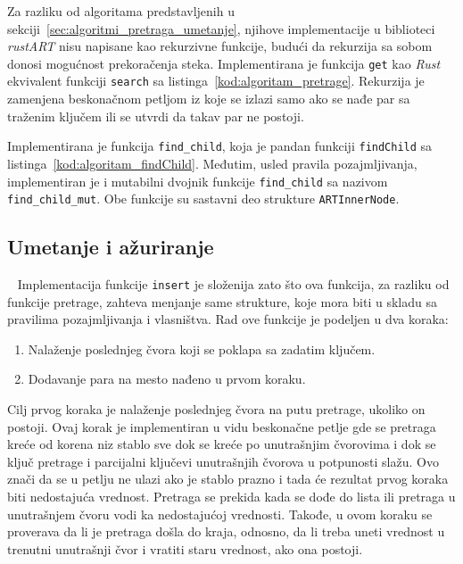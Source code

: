 \documentclass[12pt,oneside]{memoir}
\begin{document}
Za razliku od algoritama predstavljenih u
sekciji~\ref{sec:algoritmi_pretraga_umetanje}, njihove implementacije u
biblioteci \textit{rustART} nisu napisane kao rekurzivne funkcije,
budući da rekurzija sa sobom donosi mogućnost prekoračenja
steka. Implementirana je
funkcija \texttt{get} kao \textit{Rust} ekvivalent funkciji
\texttt{search} sa listinga~\ref{kod:algoritam_pretrage}.
Rekurzija je zamenjena beskonačnom petljom iz koje se izlazi samo
ako se nađe par sa traženim ključem ili se utvrdi da takav par
ne postoji.

Implementirana je funkcija \texttt{find\_child},
koja je pandan funkciji \texttt{findChild}
sa listinga~\ref{kod:algoritam_findChild}. Međutim, usled
pravila pozajmljivanja, implementiran je i mutabilni dvojnik
funkcije \texttt{find\_child}
sa nazivom \texttt{find\_child\_mut}. Obe funkcije su sastavni
deo strukture \texttt{ARTInnerNode}.

\newpage

\subsection{Umetanje i ažuriranje}~\label{subsec:umetanje_azururanje}
Implementacija funkcije \texttt{insert} je složenija
zato što ova funkcija, za razliku od funkcije pretrage, zahteva
menjanje same strukture, koje mora biti u skladu sa pravilima
pozajmljivanja i vlasništva. Rad ove funkcije je podeljen u
dva koraka:

\begin{enumerate}
  \item Nalaženje poslednjeg
        čvora koji se poklapa sa zadatim ključem.

  \item Dodavanje para na mesto nađeno u prvom koraku.
\end{enumerate}

Cilj prvog koraka je nalaženje poslednjeg čvora
na putu pretrage, ukoliko on postoji.
Ovaj korak je implementiran u vidu beskonačne petlje
gde se pretraga kreće od korena
niz stablo sve dok se kreće po unutrašnjim čvorovima i dok se ključ
pretrage i parcijalni ključevi unutrašnjih čvorova u potpunosti slažu.
Ovo znači da se u petlju ne ulazi ako je stablo prazno i tada će
rezultat prvog koraka biti nedostajuća vrednost.
Pretraga se prekida kada se dođe do lista ili pretraga u unutrašnjem
čvoru vodi ka nedostajućoj vrednosti.
Takođe, u ovom koraku se proverava da li je pretraga došla do kraja,
odnosno, da li treba uneti vrednost u trenutni unutrašnji čvor
i vratiti staru vrednost, ako ona postoji.
\end{document}
